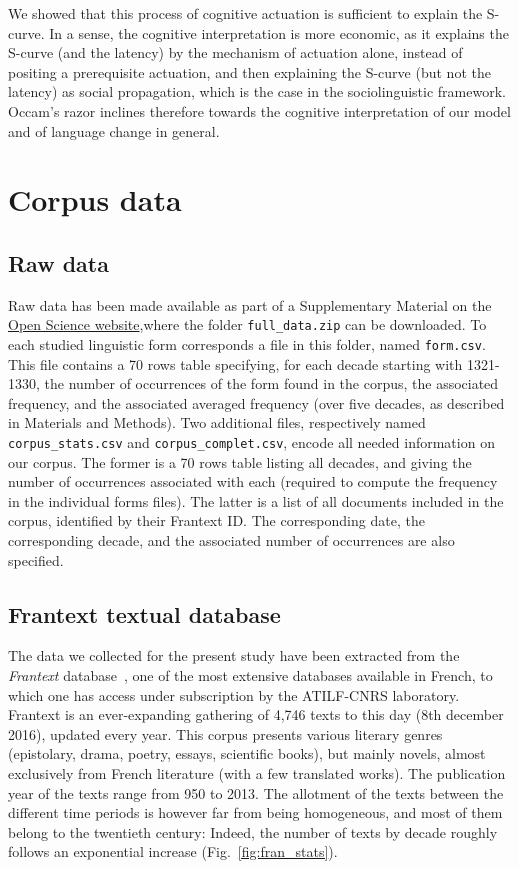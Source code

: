 \documentclass[12pt,twocolumn,amsmath,amssymb,aps,longbibliography]{revtex4-1}  %
\begin{document}
We showed that this process of cognitive actuation is sufficient to explain the S-curve. In a sense, the cognitive interpretation is more economic, as it explains the S-curve (and the latency) by the mechanism of actuation alone, instead of positing a prerequisite actuation, and then explaining the S-curve (but not the latency) as social propagation, which is the case in the sociolinguistic framework. Occam's razor inclines therefore towards the cognitive interpretation of our model and of language change in general. 

\section{Corpus data}

\subsection{Raw data \label{data}}

Raw data has been made available as part of a Supplementary Material on the \href{https://doi.org/10.6084/m9.figshare.c.3910621.v2}{Open Science website},where the folder \texttt{full\_data.zip} can be downloaded. To each studied linguistic form corresponds a file in this folder, named \texttt{form.csv}. This file contains a 70 rows table specifying, for each decade starting with 1321-1330, the number of occurrences of the form found in the corpus, the associated frequency, and the associated averaged frequency (over five decades, as described in Materials and Methods). Two additional files, respectively named \texttt{corpus\_stats.csv} and \texttt{corpus\_complet.csv}, encode all needed information on our corpus. The former is a 70 rows table listing all decades, and giving the number of occurrences associated with each (required to compute the frequency in the individual forms files). The latter is a list of all documents included in the corpus, identified by their Frantext ID. The corresponding date, the corresponding decade, and the associated number of occurrences are also specified. 

\subsection{Frantext textual database \label{A1}}

The data we collected for the present study have been extracted from the {\it Frantext} database~\cite{frantext}, one of the most extensive databases available in French, to which one has access under subscription by the ATILF-CNRS laboratory. Frantext is an ever-expanding gathering of 4,746 texts to this day (8th december 2016), updated every year. This corpus presents various literary genres (epistolary, drama, poetry, essays, scientific books), but mainly novels, almost exclusively from French literature (with a few translated works). The publication year of the texts range from 950 to 2013. The allotment of the texts between the different time periods is however far from being homogeneous, and most of them belong to the twentieth century: Indeed, the number of texts by decade roughly follows an exponential increase (Fig.~\ref{fig:fran_stats}). 
\end{document}
